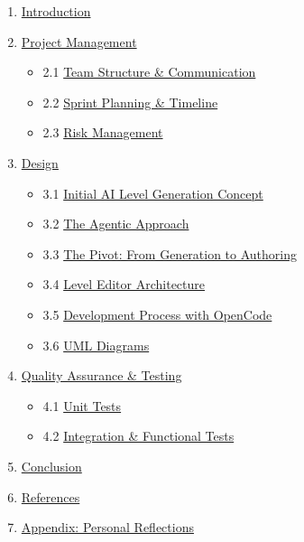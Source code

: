 \begin{enumerate}
\def\labelenumi{\arabic{enumi}.}
\tightlist
\item
  \hyperref[introduction]{Introduction}
\item
  \hyperref[project-management]{Project Management}

  \begin{itemize}
  \tightlist
  \item
    2.1 \hyperref[21-team-structure--communication]{Team Structure \&
    Communication}
  \item
    2.2 \hyperref[22-sprint-planning--timeline]{Sprint Planning \&
    Timeline}
  \item
    2.3 \hyperref[23-risk-management]{Risk Management}
  \end{itemize}
\item
  \hyperref[design]{Design}

  \begin{itemize}
  \tightlist
  \item
    3.1 \hyperref[31-initial-ai-level-generation-concept]{Initial AI
    Level Generation Concept}
  \item
    3.2 \hyperref[32-the-agentic-approach]{The Agentic Approach}
  \item
    3.3 \hyperref[33-the-pivot-from-generation-to-authoring]{The Pivot:
    From Generation to Authoring}
  \item
    3.4 \hyperref[34-level-editor-architecture]{Level Editor
    Architecture}
  \item
    3.5 \hyperref[35-development-process-with-opencode]{Development
    Process with OpenCode}
  \item
    3.6 \hyperref[36-uml-diagrams]{UML Diagrams}
  \end{itemize}
\item
  \hyperref[quality-assurance--testing]{Quality Assurance \& Testing}

  \begin{itemize}
  \tightlist
  \item
    4.1 \hyperref[41-unit-tests]{Unit Tests}
  \item
    4.2 \hyperref[42-integration--functional-tests]{Integration \&
    Functional Tests}
  \end{itemize}
\item
  \hyperref[conclusion]{Conclusion}
\item
  \hyperref[references]{References}
\item
  \hyperref[appendix-personal-reflections]{Appendix: Personal
  Reflections}
\end{enumerate}

